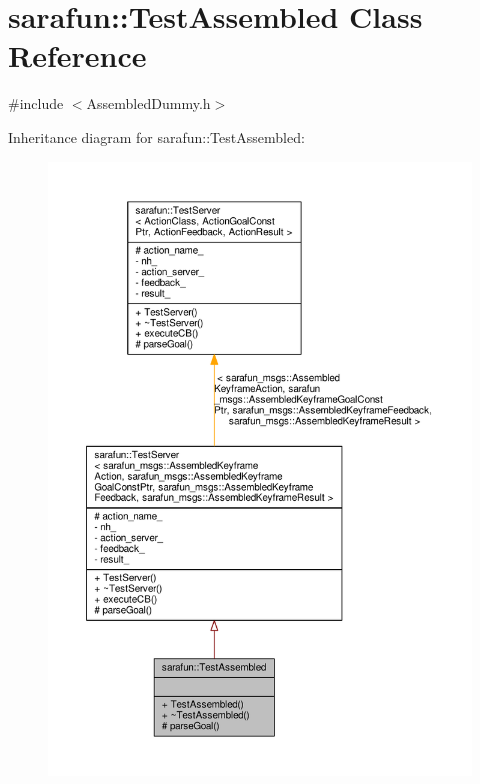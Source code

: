 \hypertarget{classsarafun_1_1TestAssembled}{\section{sarafun\-:\-:Test\-Assembled Class Reference}
\label{classsarafun_1_1TestAssembled}
}


{\ttfamily \#include $<$Assembled\-Dummy.\-h$>$}



Inheritance diagram for sarafun\-:\-:Test\-Assembled\-:
\nopagebreak
\begin{figure}[H]
\begin{center}
\leavevmode
\includegraphics[width=350pt]{d4/d6a/classsarafun_1_1TestAssembled__inherit__graph}
\end{center}
\end{figure}


